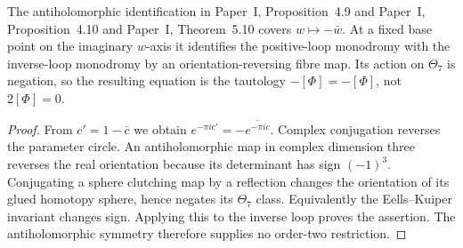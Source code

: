 \begin{proposition}\label{push:src:C.4.2}
The antiholomorphic identification in Paper~I, Proposition~4.9 and Paper~I, Proposition~4.10 and Paper~I, Theorem~5.10 covers
$w\mapsto-\bar w$. At a fixed base point on the imaginary
$w$-axis it identifies the positive-loop monodromy with the
inverse-loop monodromy by an orientation-reversing fibre map.
Its action on $\Theta_7$ is negation, so the resulting equation is
the tautology $-[\Phi]=-[\Phi]$, not $2[\Phi]=0$.
\end{proposition}


\begin{proof}
From $c'=1-\bar c$ we obtain
$e^{-\pi ic'}=-\overline{e^{-\pi ic}}$.
Complex conjugation reverses the parameter circle. An
antiholomorphic map in complex dimension three reverses the real
orientation because its determinant has sign $(-1)^3$.
Conjugating a sphere clutching map by a reflection changes the
orientation of its glued homotopy sphere, hence negates its
$\Theta_7$ class. Equivalently the Eells--Kuiper invariant changes
sign. Applying this to the inverse loop proves the assertion.
The antiholomorphic symmetry therefore supplies no order-two restriction.
\end{proof}


